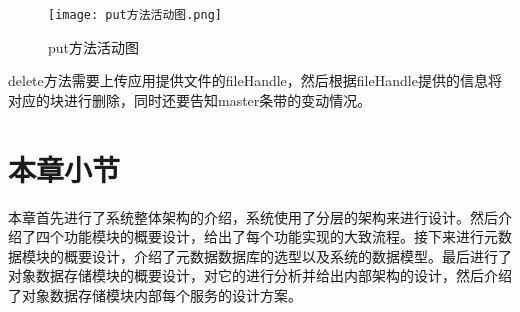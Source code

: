 \begin{figure}[h]
  \centering
  \texttt{[image: put方法活动图.png]}
  \caption{put方法活动图}
  \label{put方法活动图}
\end{figure}

delete方法需要上传应用提供文件的fileHandle，然后根据fileHandle提供的信息将对应的块进行删除，同时还要告知master条带的变动情况。

\section{本章小节}
本章首先进行了系统整体架构的介绍，系统使用了分层的架构来进行设计。然后介绍了四个功能模块的概要设计，给出了每个功能实现的大致流程。接下来进行元数据模块的概要设计，介绍了元数据数据库的选型以及系统的数据模型。最后进行了对象数据存储模块的概要设计，对它的进行分析并给出内部架构的设计，然后介绍了对象数据存储模块内部每个服务的设计方案。